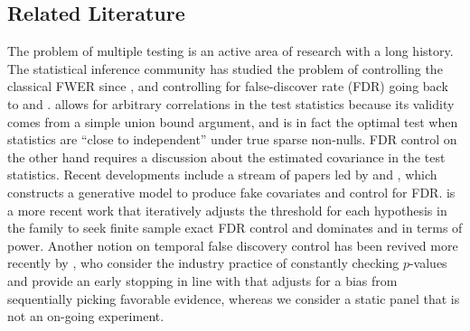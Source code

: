 \documentclass[11pt]{article}
\begin{document}
	
	
	\label{sec:intro}
	
	\subsection{Related Literature}
	\label{sec:lit}
	
	The problem of multiple testing is an active area of research with a long history. The statistical inference community has studied the problem of controlling the classical FWER since \cite{Bonf}, and controlling for false-discover rate (FDR) going back to \cite{BH95} and \cite{BY01}. \cite{Bonf} allows for arbitrary correlations in the test statistics because its validity comes from a simple union bound argument, and is in fact the optimal test when statistics are ``close to independent'' under true sparse non-nulls. FDR control on the other hand requires a discussion about the estimated covariance in the test statistics. Recent developments include a stream of papers led by \cite{15-AOS1337} and \cite{rssb.12265}, which constructs a generative model to produce fake covariates and control for FDR. \cite{fithian2022conditional} is a more recent work that iteratively adjusts the threshold for each hypothesis in the family to seek finite sample exact FDR control and dominates \cite{BH95} and \cite{BY01} in terms of power. Another notion on temporal false discovery control has been revived more recently by \cite{doi:10.1287/opre.2021.2135}, who consider the industry practice of constantly checking $p$-values and provide an early stopping in line with \cite{SiegmundSeq} that adjusts for a bias from sequentially picking favorable evidence, whereas we consider a static panel that is not an on-going experiment. 
	
\end{document}
